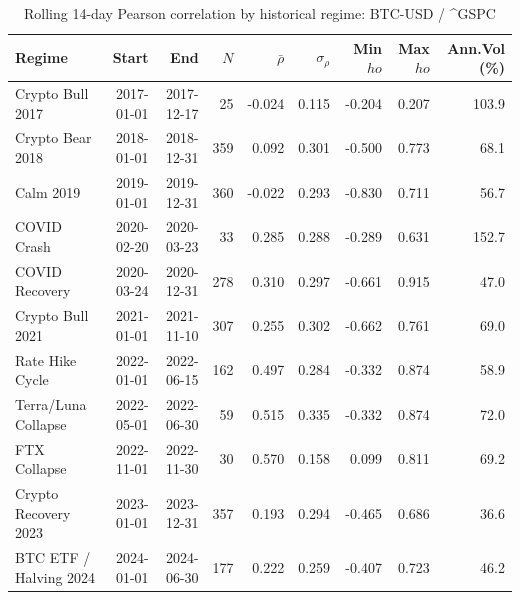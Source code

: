 \begin{table}[H]
\centering
\small
\caption{Rolling 14-day Pearson correlation by historical regime: BTC-USD / ^GSPC}
\label{tab:regime_corr_BTCUSDGSPC}
\begin{tabular}{lrrrrrrrr}
\toprule
Regime & Start & End & $N$ & $\bar{\rho}$ & $\sigma_\rho$ & Min $
ho$ & Max $
ho$ & Ann.Vol (\%) \\
\midrule
Crypto Bull 2017 & 2017-01-01 & 2017-12-17 & 25 & -0.024 & 0.115 & -0.204 & 0.207 & 103.9 \\
Crypto Bear 2018 & 2018-01-01 & 2018-12-31 & 359 & 0.092 & 0.301 & -0.500 & 0.773 & 68.1 \\
Calm 2019 & 2019-01-01 & 2019-12-31 & 360 & -0.022 & 0.293 & -0.830 & 0.711 & 56.7 \\
COVID Crash & 2020-02-20 & 2020-03-23 & 33 & 0.285 & 0.288 & -0.289 & 0.631 & 152.7 \\
COVID Recovery & 2020-03-24 & 2020-12-31 & 278 & 0.310 & 0.297 & -0.661 & 0.915 & 47.0 \\
Crypto Bull 2021 & 2021-01-01 & 2021-11-10 & 307 & 0.255 & 0.302 & -0.662 & 0.761 & 69.0 \\
Rate Hike Cycle & 2022-01-01 & 2022-06-15 & 162 & 0.497 & 0.284 & -0.332 & 0.874 & 58.9 \\
Terra/Luna Collapse & 2022-05-01 & 2022-06-30 & 59 & 0.515 & 0.335 & -0.332 & 0.874 & 72.0 \\
FTX Collapse & 2022-11-01 & 2022-11-30 & 30 & 0.570 & 0.158 & 0.099 & 0.811 & 69.2 \\
Crypto Recovery 2023 & 2023-01-01 & 2023-12-31 & 357 & 0.193 & 0.294 & -0.465 & 0.686 & 36.6 \\
BTC ETF / Halving 2024 & 2024-01-01 & 2024-06-30 & 177 & 0.222 & 0.259 & -0.407 & 0.723 & 46.2 \\
\bottomrule
\end{tabular}
\end{table}